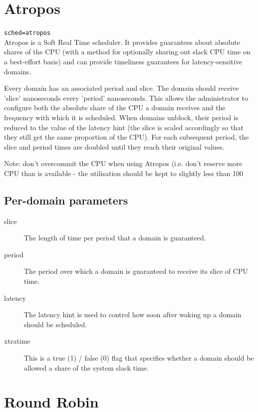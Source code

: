 \documentclass[11pt,twoside,final,openright]{xenstyle}
\begin{document}
{\section{Atropos}

{\tt sched=atropos } \\

Atropos is a Soft Real Time scheduler.  It provides guarantees about
absolute shares of the CPU (with a method for optionally sharing out
slack CPU time on a best-effort basis) and can provide timeliness
guarantees for latency-sensitive domains.

Every domain has an associated period and slice.  The domain should
receive 'slice' nanoseconds every 'period' nanoseconds.  This allows
the administrator to configure both the absolute share of the CPU a
domain receives and the frequency with which it is scheduled.  When
domains unblock, their period is reduced to the value of the latency
hint (the slice is scaled accordingly so that they still get the same
proportion of the CPU).  For each subsequent period, the slice and
period times are doubled until they reach their original values.

Note: don't overcommit the CPU when using Atropos (i.e. don't reserve
more CPU than is available - the utilisation should be kept to
slightly less than 100%

\subsection{Per-domain parameters}

\begin{description}
\item[slice]
  The length of time per period that a domain is guaranteed.
\item[period]
  The period over which a domain is guaranteed to receive
  its slice of CPU time.
\item[latency]
  The latency hint is used to control how soon after
  waking up a domain should be scheduled.
\item[xtratime]
  This is a true (1) / false (0) flag that specifies whether
  a domain should be allowed a share of the system slack time.
\end{description}

\section{Round Robin}

}
\end{document}
